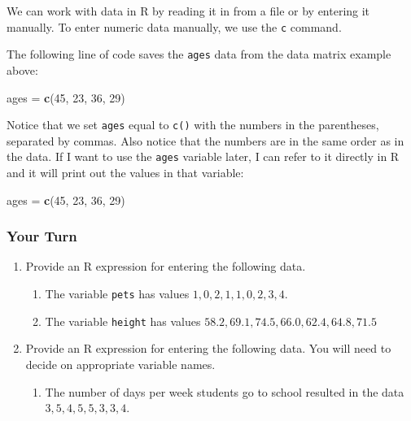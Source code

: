 \documentclass[
]{book}
\newenvironment{Shaded}{\begin{snugshade}}{\end{snugshade}}
\newcommand{\DecValTok}[1]{\textcolor[rgb]{0.00,0.00,0.81}{#1}}
\newcommand{\FunctionTok}[1]{\textcolor[rgb]{0.13,0.29,0.53}{\textbf{#1}}}
\newcommand{\NormalTok}[1]{#1}
\newcommand{\OtherTok}[1]{\textcolor[rgb]{0.56,0.35,0.01}{#1}}
\providecommand{\tightlist}{%
  \setlength{\itemsep}{0pt}\setlength{\parskip}{0pt}}
\begin{document}
We can work with data in R by reading it in from a file or by entering it manually. To enter numeric data manually, we use the \texttt{c} command.

The following line of code saves the \texttt{ages} data from the data matrix example above:

\begin{Shaded}
\begin{Highlighting}[]
\NormalTok{ages }\OtherTok{=} \FunctionTok{c}\NormalTok{(}\DecValTok{45}\NormalTok{, }\DecValTok{23}\NormalTok{, }\DecValTok{36}\NormalTok{, }\DecValTok{29}\NormalTok{)}
\end{Highlighting}
\end{Shaded}

Notice that we set \texttt{ages} equal to \texttt{c()} with the numbers in the parentheses, separated by commas. Also notice that the numbers are in the same order as in the data. If I want to use the \texttt{ages} variable later, I can refer to it directly in R and it will print out the values in that variable:

\begin{Shaded}
\begin{Highlighting}[]
\NormalTok{ages }\OtherTok{=} \FunctionTok{c}\NormalTok{(}\DecValTok{45}\NormalTok{, }\DecValTok{23}\NormalTok{, }\DecValTok{36}\NormalTok{, }\DecValTok{29}\NormalTok{)}
\end{Highlighting}
\end{Shaded}

\subsubsection*{Your Turn}\label{your-turn-3}

\begin{enumerate}
\def\labelenumi{\arabic{enumi}.}
\setcounter{enumi}{4}
\tightlist
\item
  Provide an R expression for entering the following data.

  \begin{enumerate}
  \def\labelenumii{\alph{enumii}.}
  \tightlist
  \item
    The variable \texttt{pets} has values \(1, 0, 2, 1, 1, 0, 2, 3, 4\).
  \item
    The variable \texttt{height} has values \(58.2, 69.1, 74.5, 66.0, 62.4, 64.8, 71.5\)
  \end{enumerate}
\item
  Provide an R expression for entering the following data. You will need to decide on appropriate variable names.

  \begin{enumerate}
  \def\labelenumii{\alph{enumii}.}
  \tightlist
  \item
    The number of days per week students go to school resulted in the data \(3, 5, 4, 5, 5, 3, 3, 4\).
  \end{enumerate}
\end{enumerate}
\end{document}
